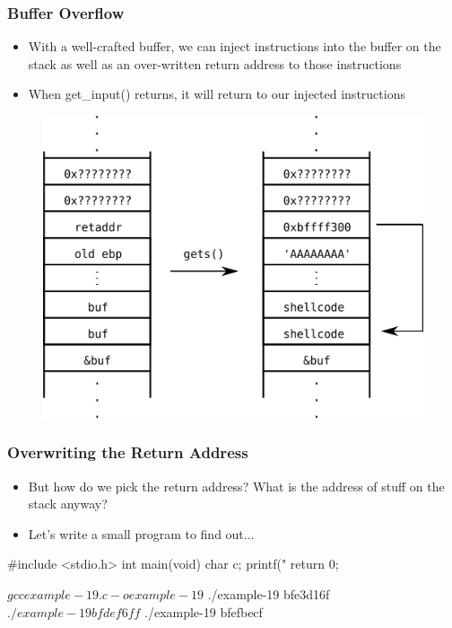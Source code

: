 \documentclass[11pt,xcolor=dvipsnames]{beamer}
\newcommand{\mvs}{\vspace{-0.95em}}
\begin{document}
\begin{frame}[fragile,t]
\frametitle{Buffer Overflow}
\mvs
\begin{itemize}
  \item With a well-crafted buffer, we can inject instructions into the buffer on the stack as well as an over-written return address to those instructions
  \item When {\ttfamily get\_input()} returns, it will return to our injected instructions
\end{itemize}
\begin{figure}
\centering
\includegraphics[height=0.60\paperheight]{figures/bufferoverflow.png}
\end{figure}
\end{frame}

\begin{frame}[fragile,t]
\frametitle{Overwriting the Return Address}
\mvs
\begin{itemize}
  \item But how do we pick the return address? What is the address of stuff on the stack anyway?
  \pause
  \item Let's write a small program to find out...
\end{itemize}
\begin{ccode}
#include <stdio.h>
int main(void) {
  char c;
  printf("%
  return 0;
}
\end{ccode}
\begin{textcode}
$ gcc example-19.c -o example-19
$ ./example-19
bfe3d16f
$ ./example-19
bfdef6ff
$ ./example-19
bfefbecf
\end{textcode}
\end{frame}
\end{document}

